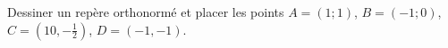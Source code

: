 
\begin{exercice}\label{exoSeconde-0001}

    Dessiner un repère orthonormé et placer les points \( A=(1;1)\), \( B=(-1;0)\), \( C=(10,-\frac{ 1 }{2})\), \( D=(-1,-1)\).

\end{exercice}
